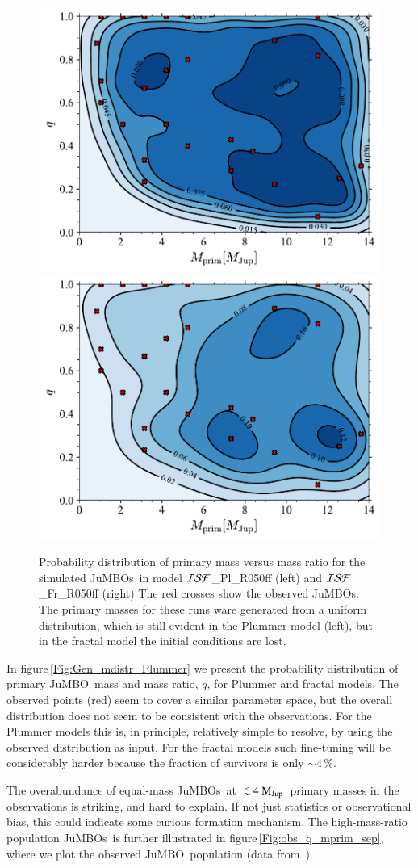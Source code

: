 \documentclass[submission,phys]{lib/SciPost}
\newcommand{\MJup}{\mbox{$\mathrm{{M}}_{\rm Jup}$}}
\def\aplt{\ {\raise-.5ex\hbox{$\buildrel<\over\sim$}}\ }
\newcommand{\jumbo}{\mbox{JuMBO}}
\newcommand{\jumbos}{\mbox{JuMBOs}}
\begin{document}
\begin{figure}
    \centering
    \includegraphics[width=0.49\columnwidth]{figures/Plummer_rvir0.5_FF_mass_distr.pdf}
    \includegraphics[width=0.49\columnwidth]{figures/Fractal_rvir0.5_FF_mass_distr.pdf}
    \caption{Probability distribution of primary mass versus mass
      ratio for the simulated \jumbos\, in model ${\cal
        ISF}$\_Pl\_R050ff (left) and ${\cal ISF}$\_Fr\_R050ff (right)
      The red crosses show the observed \jumbos.  The primary masses
      for these runs ware generated from a uniform distribution, which
      is still evident in the Plummer model (left), but in the fractal
      model the initial conditions are lost.  }
         \label{Fig:Gen_mdistr_Plummer}
         \label{Fig:Gen_mdistr_Fractal}
\end{figure}

In figure\,\ref{Fig:Gen_mdistr_Plummer} we present the probability
distribution of primary \jumbo\, mass and mass ratio, $q$, for Plummer
and fractal models.  The observed points (red) seem to cover a similar
parameter space, but the overall distribution does not seem to be
consistent with the observations. For the Plummer models this is, in
principle, relatively simple to resolve, by using the observed
distribution as input. For the fractal models such fine-tuning will be
considerably harder because the fraction of survivors is only $\sim
4$\,\%.

The overabundance of equal-mass \jumbos\, at $\aplt 4$\,\MJup\,
primary masses in the observations is striking, and hard to
explain. If not just statistics or observational bias, this could
indicate some curious formation mechanism. The high-mass-ratio
population \jumbos\, is further illustrated in
figure\,\ref{Fig:obs_q_mprim_sep}, where we plot the observed \jumbo\,
population (data from \,\cite{2023arXiv231001231P}).
\end{document}
